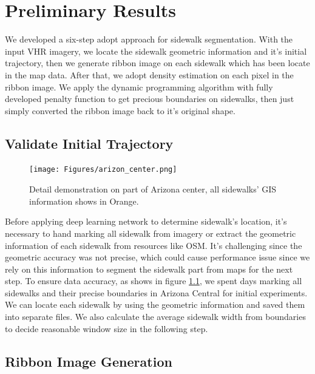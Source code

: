 \chapter{Preliminary Results}

We developed a six-step adopt approach for sidewalk segmentation. 
With the input \ac{VHR} imagery, we locate the sidewalk geometric information and it's initial trajectory, then we generate ribbon image on each sidewalk which has been locate in the map data. 
After that, we adopt density estimation on each pixel in the ribbon image. 
We apply the dynamic programming algorithm with fully developed penalty function to get precious boundaries on sidewalks, then just simply converted the ribbon image back to it's original shape.

\section{Validate Initial Trajectory}

\begin{figure}[H]
    \centering
    \texttt{[image: Figures/arizon\_center.png]}
    \caption[Demonstration on Arizona Center]{Detail demonstration on part of Arizona center, all sidewalks' \ac{GIS} information shows in Orange.}
    \label{fig:arizon_center}
\end{figure}

Before applying deep learning network to determine sidewalk's location, it's necessary to hand marking all sidewalk from imagery or extract the geometric information of each sidewalk from resources like \ac{OSM}. 
It's challenging since the geometric accuracy was not precise, which could cause performance issue since we rely on this information to segment the sidewalk part from maps for the next step. 
To ensure data accuracy, as shows in figure \ref{fig:arizon_center}, we spent days marking all sidewalks and their precise boundaries in Arizona Central for initial experiments. 
We can locate each sidewalk by using the geometric information and saved them into separate files. 
We also calculate the average sidewalk width from boundaries to decide reasonable window size in the following step.

\section{Ribbon Image Generation}

